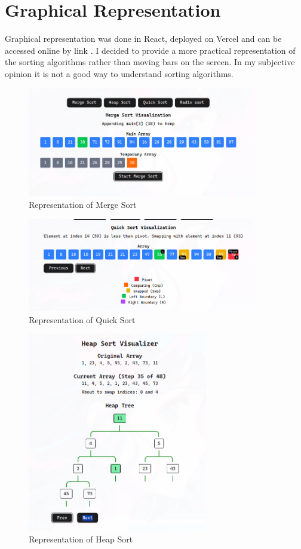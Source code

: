 \documentclass[12pt]{article}
\begin{document}
\clearpage
\section*{Graphical Representation}
\hspace{0.8cm}
Graphical representation was done in React, deployed on Vercel and can be accessed online by link \cite{site}.
I decided to provide a more practical representation of the sorting algorithms rather than moving bars on the
screen. In my subjective opinion it is not a good way to understand sorting algorithms.
\begin{figure}[h]
    \centering
    \includegraphics[width=0.9\textwidth]{merge_im.png}
    \caption{Representation of Merge Sort}
\end{figure}

\begin{figure}[h]
    \centering
    \includegraphics[width=0.9\textwidth]{quick_im.png}
    \caption{Representation of Quick Sort}
\end{figure}

\begin{figure}[h]
    \centering
    \includegraphics[width=0.7\textwidth]{heap_im.png}
    \caption{Representation of Heap Sort}
\end{figure}
\end{document}
